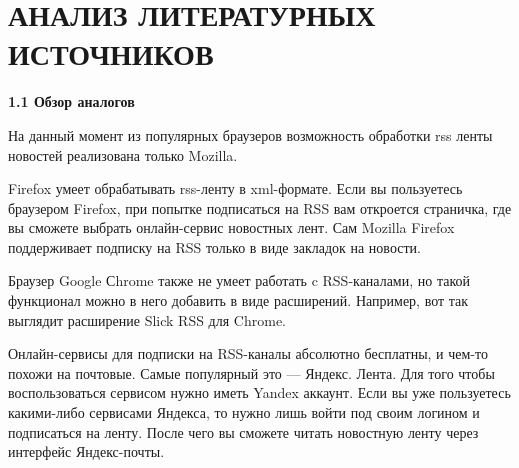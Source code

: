 \documentclass[14pt,a4paper]{extreport}
\begin{document}
	
	\newpage

	\item\section*{\normalsize\hspace{2ex}АНАЛИЗ ЛИТЕРАТУРНЫХ ИСТОЧНИКОВ}
	
	\textbf{1.1  Обзор аналогов}
	
\hspace {4ex}На данный момент из популярных браузеров возможность обработки rss ленты новостей реализована только Mozilla.

\hspace{4ex}Firefox умеет обрабатывать rss-ленту в xml-формате.    Если вы пользуетесь браузером Firefox, при попытке подписаться на RSS вам откроется страничка, где вы сможете выбрать онлайн-сервис новостных лент. Сам Mozilla Firefox поддерживает подписку на RSS только в виде закладок на новости.

\hspace{4ex}Браузер Google Сhrome также не умеет работать c RSS-каналами, но такой функционал можно в него добавить в виде расширений. Например, вот так выглядит расширение Slick RSS для Chrome.

\hspace{4ex}Онлайн-сервисы для подписки на RSS-каналы абсолютно бесплатны, и чем-то похожи на почтовые. Самые популярный это — Яндекс. Лента.  Для того чтобы воспользоваться сервисом нужно иметь Yandex аккаунт.   Если вы уже пользуетесь какими-либо сервисами Яндекса, то нужно лишь войти под своим логином и подписаться на ленту. После чего вы сможете читать новостную ленту через интерфейс Яндекс-почты.
\end{document}
